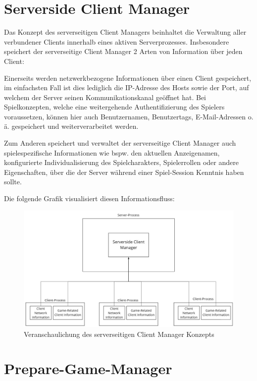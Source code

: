 \section{Serverside Client Manager}

\label{serverside_client_manager}

Das Konzept des serverseitigen Client Managers beinhaltet die Verwaltung aller verbundener Clients innerhalb eines aktiven Serverprozesses. Insbesondere speichert der serverseitige Client Manager 2 Arten von Information über jeden Client:

Einerseits werden netzwerkbezogene Informationen über einen Client gespeichert, im einfachsten Fall ist dies lediglich die IP-Adresse des Hosts sowie der Port, auf welchem der Server seinen Kommunikationskanal geöffnet hat. Bei Spielkonzepten, welche eine weitergehende Authentifizierung des Spielers voraussetzen, können hier auch Benutzernamen, Benutzertags, E-Mail-Adressen o. ä. gespeichert und weiterverarbeitet werden.

Zum Anderen speichert und verwaltet der serverseitige Client Manager auch spielespezifische Informationen wie bspw. den aktuellen Anzeigenamen, konfigurierte Individualisierung des Spielcharakters, Spielerrollen oder andere Eigenschaften, über die der Server während einer Spiel-Session Kenntnis haben sollte.

Die folgende Grafik visualisiert diesen Informationsfluss:

\begin{figure}[H]
	\centering
	\includegraphics[width=150mm]{images/serversided_client_manager.jpg}
	\caption[Serversided Client Manager]{Veranschaulichung des serverseitigen Client Manager Konzepts}
	\label{pic:serversided_client_manager}
\end{figure}

\section{Prepare-Game-Manager}

